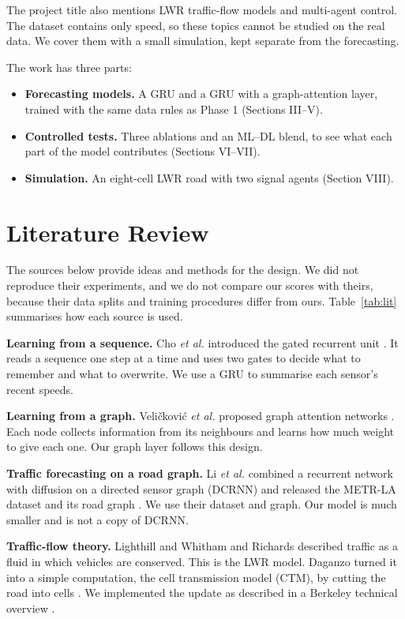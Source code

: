 \documentclass[conference]{IEEEtran}
\begin{document}
The project title also mentions LWR traffic-flow models and multi-agent control. The dataset contains only speed, so these topics cannot be studied on the real data. We cover them with a small simulation, kept separate from the forecasting.

The work has three parts:
\begin{itemize}
\item \textbf{Forecasting models.} A GRU and a GRU with a graph-attention layer, trained with the same data rules as Phase 1 (Sections III--V).
\item \textbf{Controlled tests.} Three ablations and an ML--DL blend, to see what each part of the model contributes (Sections VI--VII).
\item \textbf{Simulation.} An eight-cell LWR road with two signal agents (Section VIII).
\end{itemize}

\section{Literature Review}
The sources below provide ideas and methods for the design. We did not reproduce their experiments, and we do not compare our scores with theirs, because their data splits and training procedures differ from ours. Table~\ref{tab:lit} summarises how each source is used.

\textbf{Learning from a sequence.} Cho \emph{et al.} introduced the gated recurrent unit \cite{cho}. It reads a sequence one step at a time and uses two gates to decide what to remember and what to overwrite. We use a GRU to summarise each sensor's recent speeds.

\textbf{Learning from a graph.} Veli\v{c}kovi\'c \emph{et al.} proposed graph attention networks \cite{gat}. Each node collects information from its neighbours and learns how much weight to give each one. Our graph layer follows this design.

\textbf{Traffic forecasting on a road graph.} Li \emph{et al.} combined a recurrent network with diffusion on a directed sensor graph (DCRNN) and released the METR-LA dataset and its road graph \cite{dcrnn}. We use their dataset and graph. Our model is much smaller and is not a copy of DCRNN.

\textbf{Traffic-flow theory.} Lighthill and Whitham \cite{lw} and Richards \cite{richards} described traffic as a fluid in which vehicles are conserved. This is the LWR model. Daganzo turned it into a simple computation, the cell transmission model (CTM), by cutting the road into cells \cite{ctm}. We implemented the update as described in a Berkeley technical overview \cite{ctmoverview}.
\end{document}
